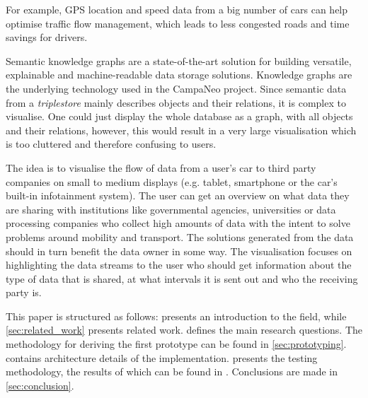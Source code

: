 \documentclass[../paper.tex]{subfiles}
\begin{document}
  For example, GPS location and speed data from a big number of cars can help
  optimise traffic flow management, which leads to less congested roads and
  time savings for drivers.

  Semantic knowledge graphs are a state-of-the-art solution for building
  versatile, explainable and machine-readable data storage solutions. Knowledge
  graphs are the underlying technology used in the CampaNeo project. Since
  semantic data from a \textit{triplestore} mainly describes objects and their
  relations, it is complex to visualise. One could just display the whole
  database as a graph, with all objects and their relations, however, this
  would result in a very large visualisation which is too cluttered and
  therefore confusing to users. %

  The idea is to visualise the flow of data from a user’s car to third party
  companies on small to medium displays (e.g. tablet, smartphone or the car’s
  built-in infotainment system). The user can get an overview on what data they
  are sharing with institutions like governmental agencies, universities or
  data processing companies who collect high amounts of data with the intent to
  solve problems around mobility and transport. The solutions generated from
  the data should in turn benefit the data owner in some way. The visualisation
  focuses on highlighting the data streams to the user who should get
  information about the type of data that is shared, at what intervals it is
  sent out and who the receiving party is.

  This paper is structured as follows:  presents an
  introduction to the field, while \cref{sec:related_work} presents related
  work.  defines the main research questions. The
  methodology for deriving the first prototype can be found in 
  \cref{sec:prototyping}.  contains architecture
  details of the implementation.  presents the 
  testing methodology, the results of which can be found in .
  Conclusions are made in \cref{sec:conclusion}.
\end{document}

